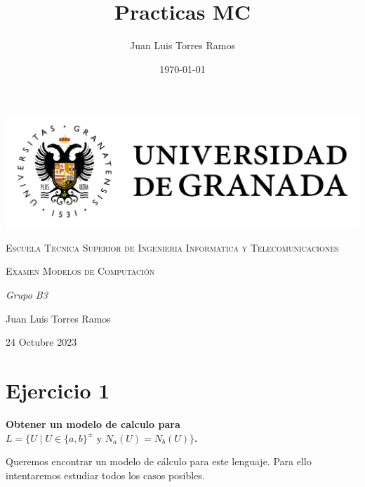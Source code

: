 \documentclass{article}
\title{Practicas MC}
\date{\today}
\author{Juan Luis Torres Ramos}
\begin{document}
        

        \begin{titlepage}
            \centering
            {\includegraphics[width=1\textwidth]{./Imagenes/logo_universidad_de_granada.png}\par}
            \vspace{1cm}
            {\scshape\Large Escuela Tecnica Superior de Ingenieria Informatica y Telecomunicaciones \par}
            \vspace{2.5cm}
            {\scshape\Huge Examen Modelos de Computación \par}
            \vspace{1cm}
            {\itshape\Large  Grupo B3 \par} 
            \vfill
            {\Large Juan Luis Torres Ramos \par}
            \vspace{0.5cm}
            {\large 24 Octubre 2023 \par}
        \end{titlepage}



        \section*{Ejercicio 1}
            \textbf{Obtener un modelo de calculo para $L = \{ U \mid U \in \{a, b\}^{\pm} \text{ y } N_a(U) = N_b(U) \}$.}
            
            \vspace{\baselineskip} %
            Queremos encontrar un modelo de cálculo para este lenguaje. Para ello intentaremos estudiar todos los casos posibles.
            \vspace{\baselineskip} %
\end{document}
